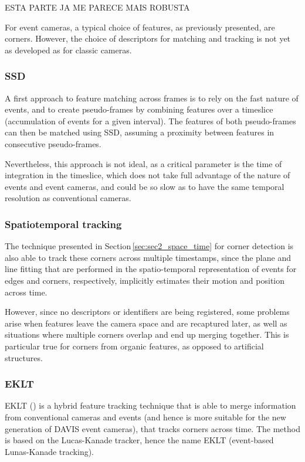 ESTA PARTE JA ME PARECE MAIS ROBUSTA

For event cameras, a typical choice of features, as previously presented, are corners. However, the choice of descriptors for matching and tracking is not yet as developed as for classic cameras.

\subsubsection{SSD}

A first approach to feature matching across frames is to rely on the fast nature of events, and to create pseudo-frames by combining features over a timeslice (accumulation of events for a given interval). The features of both pseudo-frames can then be matched using SSD, assuming a proximity between features in consecutive pseudo-frames. 

Nevertheless, this approach is not ideal, as a critical parameter is the time of integration in the timeslice, which does not take full advantage of the nature of events and event cameras, and could be so slow as to have the same temporal resolution as conventional cameras.

\subsubsection{Spatiotemporal tracking}

The technique presented in Section\,\ref{sec:sec2_space_time} for corner detection is also able to track these corners across multiple timestamps, since the plane and line fitting that are performed in the spatio-temporal representation of events for edges and corners, respectively, implicitly estimates their motion and position across time.

However, since no descriptors or identifiers are being registered, some problems arise when features leave the camera space and are recaptured later, as well as situations where multiple corners overlap and end up merging together. This is particular true for corners from organic features, as opposed to artificial structures.


\subsubsection{EKLT}

EKLT (\cite{gehrig2020eklt}) is a hybrid feature tracking technique that is able to merge information from conventional cameras and events (and hence is more suitable for the new generation of DAVIS event cameras), that tracks corners across time. The method is based on the Lucas-Kanade tracker, hence the name EKLT (event-based Lunas-Kanade tracking).

